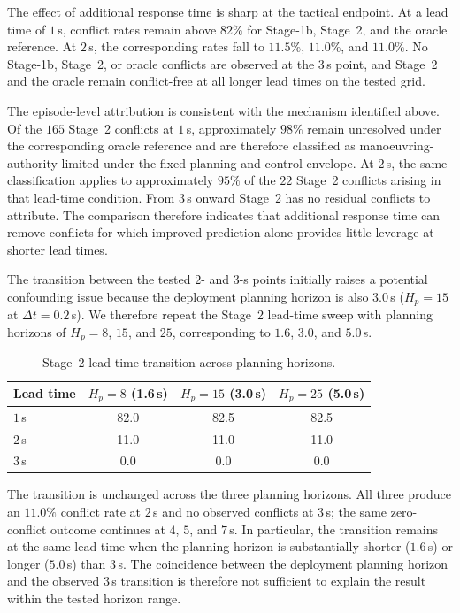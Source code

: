 \documentclass[11pt]{article}
\theoremstyle{plain}
\theoremstyle{definition}
\begin{document}
The effect of additional response time is sharp at the tactical
endpoint. At a lead time of $1$\,s, conflict rates remain above
$82\%$ for Stage-1b, Stage~2, and the oracle reference. At $2$\,s,
the corresponding rates fall to $11.5\%$, $11.0\%$, and $11.0\%$.
No Stage-1b, Stage~2, or oracle conflicts are observed at the
$3$\,s point, and Stage~2 and the oracle remain conflict-free at all
longer lead times on the tested grid.

The episode-level attribution is consistent with the mechanism
identified above. Of the $165$ Stage~2 conflicts at $1$\,s,
approximately $98\%$ remain unresolved under the corresponding oracle
reference and are therefore classified as
manoeuvring-authority-limited under the fixed planning and control
envelope. At $2$\,s, the same classification applies to approximately
$95\%$ of the $22$ Stage~2 conflicts arising in that lead-time
condition. From $3$\,s onward Stage~2
has no residual conflicts to attribute. The comparison therefore
indicates that additional response time can remove conflicts for which
improved prediction alone provides little leverage at shorter lead
times.

The transition between the tested $2$- and $3$-s points initially
raises a potential confounding issue because the deployment planning
horizon is also $3.0$\,s
($H_p=15$ at $\Delta t=0.2$\,s). We therefore repeat the Stage~2
lead-time sweep with planning horizons of $H_p=8$, $15$, and $25$,
corresponding to $1.6$, $3.0$, and $5.0$\,s.

\begin{table}[tb]
	\centering
	\small
	\caption{Stage~2 lead-time transition across planning horizons.}
	\label{tab:leadtime-horizon}
	\begin{tabular}{lccc}
		\toprule
		Lead time
		& $H_p=8$ (1.6\,s)
		& $H_p=15$ (3.0\,s)
		& $H_p=25$ (5.0\,s) \\
		\midrule
		$1$\,s & 82.0 & 82.5 & 82.5 \\
		$2$\,s & 11.0 & 11.0 & 11.0 \\
		$3$\,s &  0.0 &  0.0 &  0.0 \\
		\bottomrule
	\end{tabular}
\end{table}

The transition is unchanged across the three planning horizons. All
three produce an $11.0\%$ conflict rate at $2$\,s and no observed
conflicts at $3$\,s; the same zero-conflict outcome continues at
$4$, $5$, and $7$\,s. In particular, the transition remains at the
same lead time when the planning horizon is substantially shorter
($1.6$\,s) or longer ($5.0$\,s) than $3$\,s. The coincidence
between the deployment planning horizon and the observed $3$\,s
transition is therefore not sufficient to explain the result within
the tested horizon range.
\end{document}
